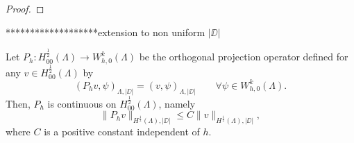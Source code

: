 \begin{proof}

\end{proof}


{\color{red}
*******************extension to non uniform $|\DD|$
}
\begin{lemma}
Let $P_h: H^{\frac 12}_{00}(\Lambda) \longrightarrow W_{h,0}^k(\Lambda)$ be the orthogonal projection operator defined  for any $v \in H^{\frac 12}_{00}(\Lambda)$ by
\begin{equation*}
(P_h v , \psi)_{\Lambda,|\DD|}= (v, \psi)_{\Lambda , |\DD|} \qquad \forall \psi \in W_{h,0}^k(\Lambda).  
\end{equation*} 
Then, $P_h$ is continuous on $H^{\frac 12}_{00}(\Lambda)$, namely
\begin{equation*}
\|P_h v\|_{H^{\frac 12}(\Lambda),|\DD|} \leq C \|v\|_{H^{\frac 12}(\Lambda),|\DD|},
\end{equation*}
where $C$ is a positive constant independent of $h$.
\end{lemma}


